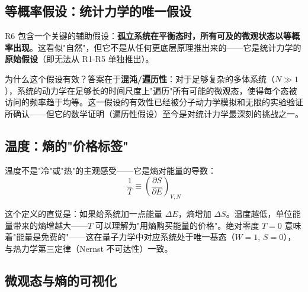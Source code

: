 \subsection{等概率假设：统计力学的唯一假设}

R6 包含一个关键的辅助假设：\textbf{孤立系统在平衡态时，所有可及的微观状态以等概率出现}。这看似"自然"，但它不是从任何更底层原理推出来的——它是统计力学的\textbf{原始假设}（即无法从 R1-R5 单独推出）。

为什么这个假设有效？答案在于\textbf{混沌/遍历性}：对于足够复杂的多体系统（$N \gg 1$），系统的动力学在足够长的时间尺度上"遍历"所有可能的微观态，使得每个态被访问的频率趋于均等。这一假设的有效性已经被分子动力学模拟和无限的实验验证所确认——但它的数学证明（遍历性假设）至今是对统计力学最深刻的挑战之一。

\subsection{温度：熵的"价格标签"}

温度不是"冷"或"热"的主观感受——它是熵对能量的导数：
\[
\frac{1}{T} \equiv \left(\frac{\partial S}{\partial E}\right)_{V,N}
\]

这个定义的直觉是：如果给系统加一点能量 $\Delta E$，熵增加 $\Delta S$。温度越低，单位能量带来的熵增越大——$T$ 可以理解为"用熵购买能量的价格"。绝对零度 $T = 0$ 意味着"能量是免费的"——这在量子力学中对应系统处于唯一基态（$W = 1$, $S = 0$），与热力学第三定律（Nernst 不可达性）一致。

\subsection{微观态与熵的可视化}

